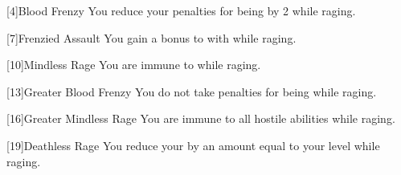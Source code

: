         [4]{Blood Frenzy}
        You reduce your penalties for being  by 2 while raging.

        [7]{Frenzied Assault}
        You gain a  bonus to  with  while raging.

        [10]{Mindless Rage}
        You are immune to   while raging.

        [13]{Greater Blood Frenzy} 
        You do not take penalties for being  while raging.

        [16]{Greater Mindless Rage} 
        You are immune to all hostile  abilities while raging.

        [19]{Deathless Rage} 
        You reduce your  by an amount equal to your level while raging.

